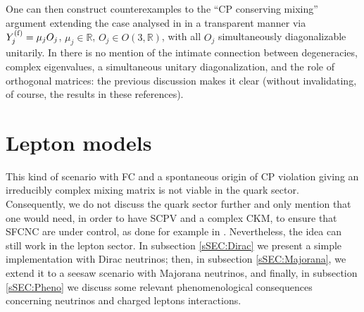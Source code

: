 \documentclass[12pt,a4paper]{article}
\begin{document}
One can then construct counterexamples to the ``CP conserving mixing'' argument extending the case analysed in \cite{Ecker:1987md} in a transparent manner via $Y_{j}^{\rm (f)}=\mu_j O_j$, $\mu_j\in\mathbb{R}$, $O_j\in O(3,\mathbb{R})$, with all $O_j$ simultaneously diagonalizable unitarily. In \cite{Ecker:1987md,Gronau:1987xz} there is no mention of the intimate connection between degeneracies, complex eigenvalues, a simultaneous unitary diagonalization, and the role of orthogonal matrices: the previous discussion makes it clear (without invalidating, of course, the results in these references).

\section{Lepton models\label{SEC:LeptonModel}}
This kind of scenario with FC and a spontaneous origin of CP violation giving an irreducibly complex mixing matrix is not viable in the quark sector. Consequently, we do not discuss the quark sector further and only mention that one would need, in order to have SCPV and a complex CKM, to ensure that SFCNC are under control, as done for example in \cite{Nebot:2018nqn}. Nevertheless, the idea can still work in the lepton sector. In subsection \ref{sSEC:Dirac} we present a simple implementation with Dirac neutrinos; then, in subsection \ref{sSEC:Majorana}, we extend it to a seesaw scenario with Majorana neutrinos, and finally, in subsection \ref{sSEC:Pheno} we discuss some relevant phenomenological consequences concerning neutrinos and charged leptons interactions.

\end{document}
